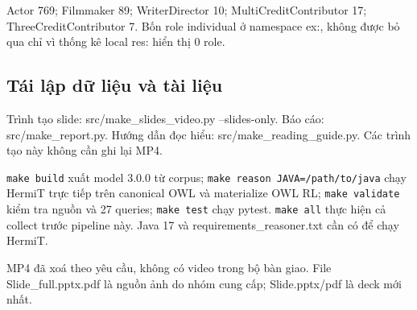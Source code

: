 \documentclass[
  11pt,
]{article}
\begin{document}
Actor 769; Filmmaker 89; Writer\allowbreak{}Di\allowbreak{}rector 10;
Multi\allowbreak{}Cre\allowbreak{}dit\allowbreak{}Contr\allowbreak{}ibutor
17;
Three\allowbreak{}Cre\allowbreak{}dit\allowbreak{}Contr\allowbreak{}ibutor
7. Bốn role individual ở namespace ex:, không được bỏ qua chỉ vì thống
kê local res: hiển thị 0 role.

\subsection{Tái lập dữ liệu và tài
liệu}\label{tuxe1i-lux1eadp-dux1eef-liux1ec7u-vuxe0-tuxe0i-liux1ec7u}

Trình tạo slide:
src/\allowbreak{}make\allowbreak{}\_\allowbreak{}slides\_\allowbreak{}video.\allowbreak{}py\allowbreak{}
--slides-only. Báo cáo:
src/\allowbreak{}make\allowbreak{}\_\allowbreak{}report.\allowbreak{}py.\allowbreak{}
Hướng dẫn đọc hiểu:
src/\allowbreak{}make\allowbreak{}\_\allowbreak{}reading\allowbreak{}\_\allowbreak{}guide.\allowbreak{}p\allowbreak{}y.\allowbreak{}
Các trình tạo này không cần ghi lại MP4.

\texttt{make bui\allowbreak{}ld} xuất model 3.0.0 từ corpus;
\texttt{make rea\allowbreak{}son \allowbreak{}J\allowbreak{}A\allowbreak{}V\allowbreak{}A\allowbreak{}=/\allowbreak{}path/\allowbreak{}t\allowbreak{}o/\allowbreak{}java}
chạy HermiT trực tiếp trên canonical OWL và materialize OWL RL;
\texttt{make val\allowbreak{}idate} kiểm tra nguồn và 27 queries;
\texttt{make tes\allowbreak{}t} chạy pytest.
\texttt{make all\allowbreak{}} thực hiện cả collect trước pipeline này.
Java 17 và
requirem\allowbreak{}ents\_\allowbreak{}rea\allowbreak{}soner.\allowbreak{}tx\allowbreak{}t
cần có để chạy HermiT.

MP4 đã xoá theo yêu cầu, không có video trong bộ bàn giao. File
Slide\_\allowbreak{}fu\allowbreak{}ll.\allowbreak{}pptx.\allowbreak{}pdf
là nguồn ảnh do nhóm cung cấp;
Slide.\allowbreak{}pp\allowbreak{}tx/\allowbreak{}pdf là deck mới nhất.
\end{document}
